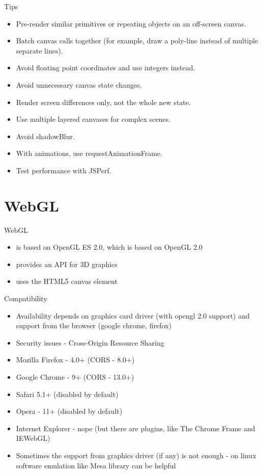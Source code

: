 \documentclass{beamer}
\begin{document}
\begin{frame}{Tips}
\begin{itemize}
    \item Pre-render similar primitives or repeating objects on an off-screen canvas.
    \item Batch canvas calls together (for example, draw a poly-line instead of multiple separate lines).
    \item Avoid floating point coordinates and use integers instead.
    \item Avoid unnecessary canvas state changes.
    \item Render screen differences only, not the whole new state.
    \item Use multiple layered canvases for complex scenes.
    \item Avoid shadowBlur.
    \item With animations, use requestAnimationFrame.
    \item Test performance with JSPerf.

\end{itemize}
\end{frame}


\section{WebGL}

\begin{frame}{WebGL}

\begin{itemize}
\item is based on OpenGL ES 2.0, which is based on OpenGL 2.0
\item provides an API for 3D graphics
\item uses the HTML5 canvas element
\end{itemize}

\end{frame}


\begin{frame}{Compatibility}

\begin{itemize}
\item Availability depends on graphics card driver (with opengl 2.0 support) and
support from the browser (google chrome, firefox)
\item Security issues - Cross-Origin Resource Sharing
\item Mozilla Firefox - 4.0+ (CORS - 8.0+)
\item Google Chrome - 9+ (CORS - 13.0+)
\item Safari 5.1+ (disabled by default)
\item Opera - 11+ (disabled by default)
\item Internet Explorer - nope (but there are plugins, like The Chrome Frame and IEWebGL)

\item Sometimes the support from graphics driver (if any) is not enough - on
linux software emulation like Mesa library can be helpful
\end{itemize}

\end{frame}
\end{document}
